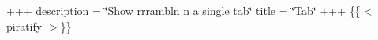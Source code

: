 +++ description = \char`\"{}\+Show rrrambl\textquotesingle{}n \textquotesingle{}n a single tab\char`\"{} title = \char`\"{}\+Tab\char`\"{} +++ \{\{$<$ piratify $>$\}\} 